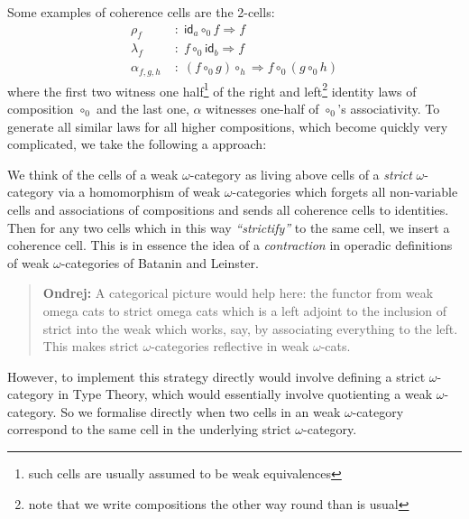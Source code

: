\documentclass[a4paper]{article}
\newcommand{\id}{\mathsf{id}}
\newenvironment{ondrej}{\begin{quote}\footnotesize \textbf{Ondrej:}}{\normalsize\end{quote}}
\begin{document}
Some examples of coherence cells are the 2-cells:
\begin{align*}
\rho_f &\;:\; \id_a \circ_0 f \Rightarrow f\\
\lambda_f & \; : \; f \circ_0 \id_b \Rightarrow f\\
\alpha_{f,g,h} & \; : \; (f \circ_0 g)\circ_h \Rightarrow f \circ_0 (g
\circ_0 h)
\end{align*}
where the first two witness one half\footnote{such cells are usually
  assumed to be weak equivalences} of the right and left\footnote{note that
  we write compositions the other way round than is usual} identity laws
of composition $\circ_0$ and the last one, $\alpha$ witnesses one-half
of $\circ_0$'s associativity. 
%
To generate all similar laws for all higher compositions, which become
quickly very complicated, we take the following a approach:

We think of the cells of a weak $\omega$-category as living above
cells of a \emph{strict} $\omega$-category via a homomorphism of weak
$\omega$-categories which forgets all non-variable cells and
associations of compositions and sends all coherence cells to
identities. Then for any two cells which in this way
\emph{``strictify''} to the same cell, we insert a coherence
cell. This is in essence the idea of a \emph{contraction} in operadic
definitions of weak $\omega$-categories of Batanin and Leinster\cite{}.
\begin{ondrej}
  A categorical picture would help here: the functor from weak omega
  cats to strict omega cats which is a left adjoint to the inclusion
  of strict into the weak which works, say, by associating everything to the
  left. This makes strict $\omega$-categories reflective in weak $\omega$-cats.
\end{ondrej}

However, to implement this strategy directly would involve defining a
strict $\omega$-category in Type Theory, which would essentially
involve quotienting a weak $\omega$-category.  So we formalise
directly when two cells in an weak $\omega$-category correspond to the
same cell in the underlying strict $\omega$-category.
%
%
\end{document}
